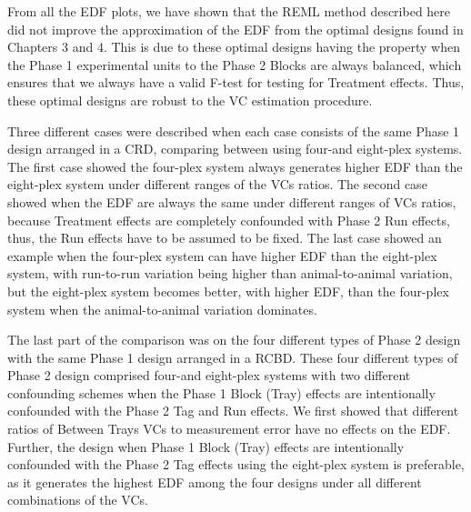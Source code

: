 From all the EDF plots, we have shown that the REML method described here did not improve the approximation of the EDF from the optimal designs found in Chapters 3 and 4. This is due to these optimal designs having the property when the Phase 1 experimental units to the Phase 2 Blocks are always balanced, which ensures that we always have a valid F-test for testing for Treatment effects. Thus, these optimal designs are robust to the VC estimation procedure.

Three different cases were described when each case consists of the same Phase 1 design arranged in a CRD, comparing between using four-and eight-plex systems. The first case showed the four-plex system always generates higher EDF than the eight-plex system under different ranges of the VCs ratios. The second case showed when the EDF are always the same under different ranges of VCs ratios, because Treatment effects are completely confounded with Phase 2 Run effects, thus, the Run effects have to be assumed to be fixed. The last case showed an example when the four-plex system can have higher EDF than the eight-plex system, with run-to-run variation being higher than animal-to-animal variation, but the eight-plex system becomes better, with higher EDF, than the four-plex system when the animal-to-animal variation dominates.

The last part of the comparison was on the four different types of Phase 2 design with the same Phase 1 design arranged in a RCBD. These four different types of Phase 2 design comprised four-and eight-plex systems with two different confounding schemes when the Phase 1 Block (Tray) effects are intentionally confounded with the Phase 2 Tag and Run effects. We first showed that different ratios of Between Trays VCs to measurement error have no effects on the EDF. Further, the design when Phase 1 Block (Tray) effects are intentionally confounded with the Phase 2 Tag effects using the eight-plex system is preferable, as it generates the highest EDF among the four designs under all different combinations of the VCs. 


